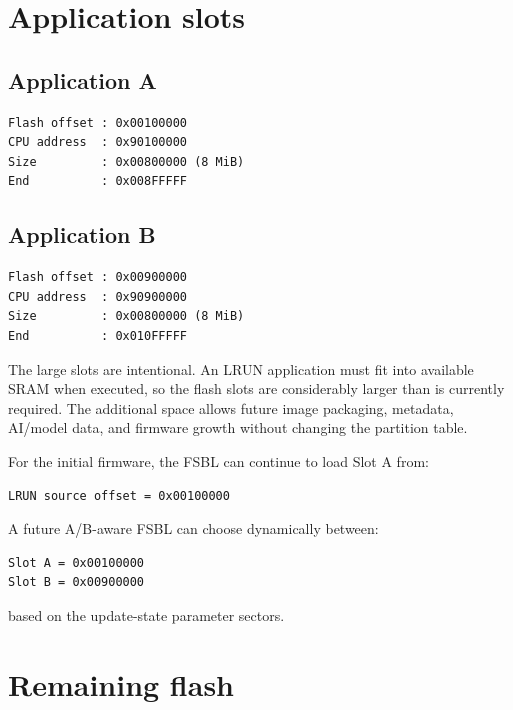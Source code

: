 \documentclass[10pt,a4paper,oneside]{report}
\begin{document}
\section{Application slots}\label{wiki-reference-flash-layout-proposal--7-application-slots}

\subsection{Application A}\label{wiki-reference-flash-layout-proposal--application-a}

\begin{verbatim}
Flash offset : 0x00100000
CPU address  : 0x90100000
Size         : 0x00800000 (8 MiB)
End          : 0x008FFFFF
\end{verbatim}

\subsection{Application B}\label{wiki-reference-flash-layout-proposal--application-b}

\begin{verbatim}
Flash offset : 0x00900000
CPU address  : 0x90900000
Size         : 0x00800000 (8 MiB)
End          : 0x010FFFFF
\end{verbatim}

The large slots are intentional. An LRUN application must fit into available SRAM when executed, so the flash slots are considerably larger than is currently required. The additional space allows future image packaging, metadata, AI/model data, and firmware growth without changing the partition table.

For the initial firmware, the FSBL can continue to load Slot A from:

\begin{verbatim}
LRUN source offset = 0x00100000
\end{verbatim}

A future A/B-aware FSBL can choose dynamically between:

\begin{verbatim}
Slot A = 0x00100000
Slot B = 0x00900000
\end{verbatim}

based on the update-state parameter sectors.

\section{Remaining flash}\label{wiki-reference-flash-layout-proposal--8-remaining-flash}
\end{document}
